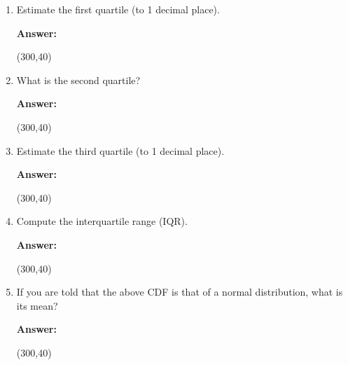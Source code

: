 \documentclass[12pt,twoside]{article}
\newcommand{\pts}[1]{\marginpar{ \small\hspace{0pt} \textit{[#1]} } }
\newcommand{\?}{\stackrel{?}{=}}
\begin{document}
\begin{enumerate}[\bf (a)]

\item Estimate the first quartile (to 1 decimal place). \pts{1}

\begin{minipage}[]{.1\linewidth}
    {\bf Answer:}
  \end{minipage}\qquad
  \begin{minipage}[]{.8\linewidth}
    \framebox(300,40){\phantom{\Huge t} }     
  \end{minipage}
  \bigskip
  
\item What is the second quartile? \pts{1}
  
\begin{minipage}[]{.1\linewidth}
    {\bf Answer:}
  \end{minipage}\qquad
  \begin{minipage}[]{.8\linewidth}
    \framebox(300,40){\phantom{\Huge t} }     
  \end{minipage}
  \bigskip
  
\item Estimate the third quartile (to 1 decimal place). \pts{1}
  
 \begin{minipage}[]{.1\linewidth}
    {\bf Answer:}
  \end{minipage}\qquad
  \begin{minipage}[]{.8\linewidth}
    \framebox(300,40){\Huge\phantom{t}}     
  \end{minipage}

  \bigskip
\item Compute the interquartile range (IQR). \pts{1}
  
 \begin{minipage}[]{.1\linewidth}
    {\bf Answer:}
  \end{minipage}\qquad
  \begin{minipage}[]{.8\linewidth}
    \framebox(300,40){\Huge\phantom{t}}     
  \end{minipage}

  \bigskip
\item If you are told that the above CDF is that of a normal distribution, what is its mean? \pts{1}
  
 \begin{minipage}[]{.1\linewidth}
    {\bf Answer:}
  \end{minipage}\qquad
  \begin{minipage}[]{.8\linewidth}
    \framebox(300,40){\Huge\phantom{t}}     
  \end{minipage}
\end{enumerate}
  \eject
\end{document}
